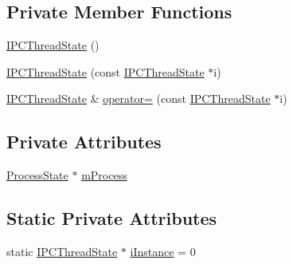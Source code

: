\subsection*{Private Member Functions}
\begin{DoxyCompactItemize}
\item 
\hyperlink{classIPCThreadState_a6e1a9d9bc01c877747ecae8df73bd14e}{I\-P\-C\-Thread\-State} ()
\item 
\hyperlink{classIPCThreadState_a368b35eb534b0b49e5c0b522d98a0a6d}{I\-P\-C\-Thread\-State} (const \hyperlink{classIPCThreadState}{I\-P\-C\-Thread\-State} $\ast$i)
\item 
\hyperlink{classIPCThreadState}{I\-P\-C\-Thread\-State} \& \hyperlink{classIPCThreadState_a4f68d05d2665e30b2d43479feba7f944}{operator=} (const \hyperlink{classIPCThreadState}{I\-P\-C\-Thread\-State} $\ast$i)
\end{DoxyCompactItemize}
\subsection*{Private Attributes}
\begin{DoxyCompactItemize}
\item 
\hyperlink{classProcessState}{Process\-State} $\ast$ \hyperlink{classIPCThreadState_aefae3c0f96244ce87f9289defee13b54}{m\-Process}
\end{DoxyCompactItemize}
\subsection*{Static Private Attributes}
\begin{DoxyCompactItemize}
\item 
static \hyperlink{classIPCThreadState}{I\-P\-C\-Thread\-State} $\ast$ \hyperlink{classIPCThreadState_a54fefc86880e0e140d40e9aa7247cc47}{i\-Instance} = 0
\end{DoxyCompactItemize}


